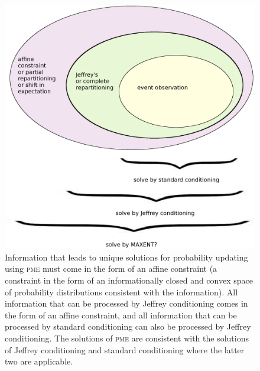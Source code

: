 \documentclass[phd,12pt,oneside]{ubcthesis}
\begin{document}
\begin{figure}[ht!]
    \begin{minipage}[h]{.7\linewidth}
      \includegraphics[width=\textwidth]{affine1.eps}
      \caption{\footnotesize Information that leads to unique
        solutions for probability updating using \textsc{pme} must
        come in the form of an affine constraint (a constraint in the
        form of an informationally closed and convex space of
        probability distributions consistent with the information).
        All information that can be processed by Jeffrey conditioning
        comes in the form of an affine constraint, and all information
        that can be processed by standard conditioning can also be
        processed by Jeffrey conditioning. The solutions of
        \textsc{pme} are consistent with the solutions of Jeffrey
        conditioning and standard conditioning where the latter two
        are applicable.}
      \label{fig:aff}
    \end{minipage}
\end{figure}
\end{document}
